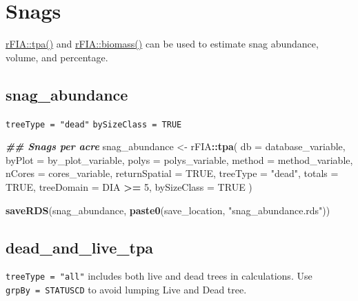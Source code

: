 \documentclass[
]{book}
\newenvironment{Shaded}{\begin{snugshade}}{\end{snugshade}}
\newcommand{\AttributeTok}[1]{\textcolor[rgb]{0.13,0.29,0.53}{#1}}
\newcommand{\ConstantTok}[1]{\textcolor[rgb]{0.56,0.35,0.01}{#1}}
\newcommand{\DecValTok}[1]{\textcolor[rgb]{0.00,0.00,0.81}{#1}}
\newcommand{\DocumentationTok}[1]{\textcolor[rgb]{0.56,0.35,0.01}{\textbf{\textit{#1}}}}
\newcommand{\FunctionTok}[1]{\textcolor[rgb]{0.13,0.29,0.53}{\textbf{#1}}}
\newcommand{\NormalTok}[1]{#1}
\newcommand{\OtherTok}[1]{\textcolor[rgb]{0.56,0.35,0.01}{#1}}
\newcommand{\SpecialCharTok}[1]{\textcolor[rgb]{0.81,0.36,0.00}{\textbf{#1}}}
\newcommand{\StringTok}[1]{\textcolor[rgb]{0.31,0.60,0.02}{#1}}
\begin{document}
\hypertarget{snags}{%
\section{Snags}\label{snags}}

\href{https://rdrr.io/cran/rFIA/man/tpa.html}{rFIA::tpa()} and \href{https://rdrr.io/cran/rFIA/man/biomass.html}{rFIA::biomass()} can be used to estimate snag abundance, volume, and percentage.

\hypertarget{snag_abundance}{%
\subsection{snag\_abundance}\label{snag_abundance}}

\texttt{treeType\ =\ "dead"} \texttt{bySizeClass\ =\ TRUE}

\begin{Shaded}
\begin{Highlighting}[]
\DocumentationTok{\#\# Snags per acre}
\NormalTok{snag\_abundance }\OtherTok{\textless{}{-}}\NormalTok{ rFIA}\SpecialCharTok{::}\FunctionTok{tpa}\NormalTok{(}
  \AttributeTok{db =}\NormalTok{ database\_variable,}
  \AttributeTok{byPlot =}\NormalTok{ by\_plot\_variable,}
  \AttributeTok{polys =}\NormalTok{ polys\_variable,}
  \AttributeTok{method =}\NormalTok{ method\_variable,}
  \AttributeTok{nCores =}\NormalTok{ cores\_variable,}
  \AttributeTok{returnSpatial =} \ConstantTok{TRUE}\NormalTok{,}
  \AttributeTok{treeType =} \StringTok{"dead"}\NormalTok{,}
  \AttributeTok{totals =} \ConstantTok{TRUE}\NormalTok{,}
  \AttributeTok{treeDomain =}\NormalTok{ DIA }\SpecialCharTok{\textgreater{}=} \DecValTok{5}\NormalTok{,}
  \AttributeTok{bySizeClass =} \ConstantTok{TRUE}
\NormalTok{)}

\FunctionTok{saveRDS}\NormalTok{(snag\_abundance, }\FunctionTok{paste0}\NormalTok{(save\_location, }\StringTok{"snag\_abundance.rds"}\NormalTok{))}
\end{Highlighting}
\end{Shaded}

\hypertarget{dead_and_live_tpa}{%
\subsection{dead\_and\_live\_tpa}\label{dead_and_live_tpa}}

\texttt{treeType\ =\ "all"} includes both live and dead trees in calculations. Use \texttt{grpBy\ =\ STATUSCD} to avoid lumping Live and Dead tree.
\end{document}
